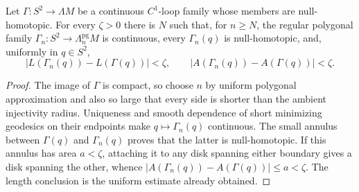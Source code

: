 \begin{theorem}
\label{cor:sphere-family-polygonal-approximation}
\notready
Let $\Gamma\colon S^2\to\Lambda M$ be a continuous $C^1$-loop family whose
members are null-homotopic.  For every $\zeta>0$ there is $N$ such that, for
$n\ge N$, the regular polygonal family
$\Gamma_n\colon S^2\to\Lambda_n^{\mathrm{pg}}M$ is continuous, every
$\Gamma_n(q)$ is null-homotopic, and, uniformly in $q\in S^2$,
\[
 |L(\Gamma_n(q))-L(\Gamma(q))|<\zeta,
 \qquad
 |A(\Gamma_n(q))-A(\Gamma(q))|<\zeta.
\]
\end{theorem}
\begin{proof}
The image of $\Gamma$ is compact, so choose $n$ by uniform polygonal
approximation and also so large that every side is shorter than the ambient
injectivity radius.  Uniqueness and smooth dependence of short minimizing
geodesics on their endpoints make $q\mapsto\Gamma_n(q)$ continuous.  The
small annulus between $\Gamma(q)$ and $\Gamma_n(q)$ proves that the latter is
null-homotopic.  If this annulus has area $a<\zeta$, attaching it to any disk
spanning either boundary gives a disk spanning the other, whence
$|A(\Gamma_n(q))-A(\Gamma(q))|\le a<\zeta$.  The length conclusion is the
uniform estimate already obtained.
\end{proof}


